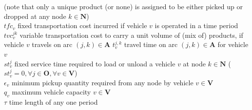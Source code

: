 \documentclass[11pt,letter]{article}
\begin{document}
\text{ } \quad \qquad (note that only a unique product (or none) is assigned to be either picked up or dropped at any node $k\in \textbf{N}$)\\
$tfc_{v}$ \quad fixed transportation cost incurred if vehicle $v$ is operated in a time period \\
$tvc_{v}^{jk}$ \quad variable transportation cost to carry a unit volume of (mix of) products, if vehicle $v$ travels on arc $(j,k) \in \textbf{A}$
$t_{v}^{j,k}$ \quad travel time on arc $(j,k)\in \textbf{A}$ for vehicle $v$ \\
$st_{v}^{j}$ \quad fixed service time required to load or unload a vehicle $v$ at node $k\in \textbf{N}$ ($st_{v}^{j}=0, \forall j \in \textbf{O}, \forall v \in \textbf{V} $) \\
$\epsilon_v$ \quad minimum pickup quantity required from any node by vehicle $v \in \textbf{V}$ \\
$q_v$ \quad maximum vehicle capacity $v \in \textbf{V}$ \\
$\tau$ \quad time length of any one period \\
\\
\end{document}
